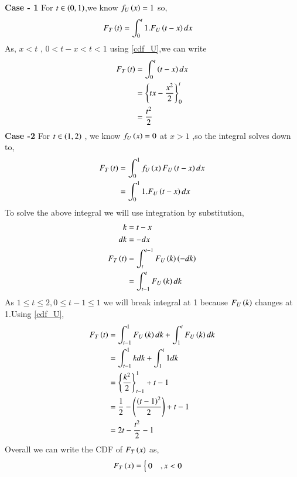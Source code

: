 \documentclass[journal,12pt,twocolumn]{IEEEtran}
\renewcommand\thesection{\arabic{section}}
\begin{document}
\begin{enumerate}[label=\thesection.\arabic*,ref=\thesection.\theenumi]
\begin{enumerate}[label=\thesection.\arabic*
,ref=\thesection.\theenumi]
\textbf{Case - 1} For $ t \in \left(0,1\right) $,we know $f_{U}\left(x\right) = 1$ so,
  \begin{align}
          F_{T}\left(t\right) &= \int_{0}^{t}1.F_{U}\left(t-x\right)dx
  \end{align}
        As, $x<t$ , $ 0<t-x< t<1$ using \eqref{cdf_U},we can write
  \begin{align}
         F_{T}\left(t\right) &= \int_{0}^{t}\left(t-x\right)dx\\
                       &= \left\{ tx - \frac{x^2}{2}\right\}_{0}^{t}\\
                       &= \frac{t^{2}}{2}
  \end{align}
 \textbf{Case -2} For $ t \in \left(1,2\right)$ , we know $f_{U}\left(x\right) = 0$ at $ x > 1$ ,so the integral solves down to,
  \begin{align}
          F_{T}\left(t\right) &= \int_{0}^{1}f_{U}\left(x\right)F_{U}\left(t-x\right)dx\\
                        &= \int_{0}^{1}1.F_{U}\left(t-x\right)dx\\
  \end{align}
   To solve the above integral we will use integration by substitution,
   \begin{align}
            k &= t-x\\
           dk &= -dx\\
           F_{T}\left(t\right) &= \int_{t}^{t-1}F_{U}\left(k\right)\left(-dk\right)\\
                         &= \int_{t-1}^{t}F_{U}\left(k\right)dk
   \end{align}
   As $ 1 \leq t \leq 2 , 0 \leq t-1 \leq 1 $ we will break integral at 1 because $ F_{U}\left(k\right)$ changes at 1.Using \eqref{cdf_U},
   \begin{align}
           F_{T}\left(t\right)  &= \int_{t-1}^{1}F_{U}\left(k\right)dk + \int_{1}^{t}F_{U}\left(k\right)dk \\
                          &= \int_{t-1}^{1}kdk + \int_{1}^{t}1dk\\
                          &= \left\{\frac{k^{2}}{2}\right\}_{t-1}^{1} + t - 1\\
                          &= \frac{1}{2} -\left(\frac{\left(t-1\right)^{2}}{2}\right) + t - 1\\
                          &= 2t - \frac{t^{2}}{2} - 1
   \end{align}
   Overall we can write the CDF of $F_{T}\left(x\right)$ as,
   \begin{align}
           F_{T}\left(x\right) &=   \begin{cases}
                                   0                      &,   x <0\\

\end{cases}
\end{align}
\end{enumerate}
\end{enumerate}
\end{document}
